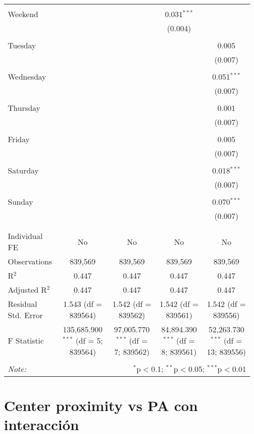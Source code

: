 \documentclass[
]{article}
\begin{document}
\begin{table}[!htbp]
{\begin{tabular}{@{\extracolsep{5pt}}lcccc}
  & & & & \\ 
 Weekend &  &  & 0.031$^{***}$ &  \\ 
  &  &  & (0.004) &  \\ 
  & & & & \\ 
 Tuesday &  &  &  & 0.005 \\ 
  &  &  &  & (0.007) \\ 
  & & & & \\ 
 Wednesday &  &  &  & 0.051$^{***}$ \\ 
  &  &  &  & (0.007) \\ 
  & & & & \\ 
 Thursday &  &  &  & 0.001 \\ 
  &  &  &  & (0.007) \\ 
  & & & & \\ 
 Friday &  &  &  & 0.005 \\ 
  &  &  &  & (0.007) \\ 
  & & & & \\ 
 Saturday &  &  &  & 0.018$^{***}$ \\ 
  &  &  &  & (0.007) \\ 
  & & & & \\ 
 Sunday &  &  &  & 0.070$^{***}$ \\ 
  &  &  &  & (0.007) \\ 
  & & & & \\ 
\hline \\[-1.8ex] 
Individual FE & No & No & No & No \\ 
Observations & 839,569 & 839,569 & 839,569 & 839,569 \\ 
R$^{2}$ & 0.447 & 0.447 & 0.447 & 0.447 \\ 
Adjusted R$^{2}$ & 0.447 & 0.447 & 0.447 & 0.447 \\ 
Residual Std. Error & 1.543 (df = 839564) & 1.542 (df = 839562) & 1.542 (df = 839561) & 1.542 (df = 839556) \\ 
F Statistic & 135,685.900$^{***}$ (df = 5; 839564) & 97,005.770$^{***}$ (df = 7; 839562) & 84,894.390$^{***}$ (df = 8; 839561) & 52,263.730$^{***}$ (df = 13; 839556) \\ 
\hline 
\hline \\[-1.8ex] 
\textit{Note:}  & \multicolumn{4}{r}{$^{*}$p$<$0.1; $^{**}$p$<$0.05; $^{***}$p$<$0.01} \\ 
\end{tabular}
} 
\end{table} 
\newpage
\section{Center proximity vs PA con interacción}
\end{document}
